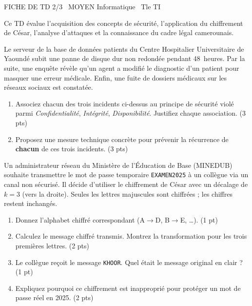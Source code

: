 \documentclass[11pt]{article}
\begin{document}
\begin{tcolorbox}[enhanced,colback=popink,colframe=popink,arc=10pt,boxrule=0pt,left=12pt,right=12pt,top=9pt,bottom=9pt]
{\color{white}\popxbold\small FICHE DE TD 2/3 \textbullet\ MOYEN \hfill Informatique \textbullet\ Tle TI\par}
\end{tcolorbox}
\vspace{4pt}
Ce TD évalue l'acquisition des concepts de sécurité, l'application du chiffrement de César, l'analyse d'attaques et la connaissance du cadre légal camerounais.

\begin{exercice}
Le serveur de la base de données patients du Centre Hospitalier Universitaire de Yaoundé subit une panne de disque dur non redondée pendant 48~heures. Par la suite, une enquête révèle qu'un agent a modifié le diagnostic d'un patient pour masquer une erreur médicale. Enfin, une fuite de dossiers médicaux sur les réseaux sociaux est constatée.
\begin{enumerate}
    \item Associez chacun des trois incidents ci-dessus au principe de sécurité violé parmi \textit{Confidentialité}, \textit{Intégrité}, \textit{Disponibilité}. Justifiez chaque association. \hfill (3 pts)
    \item Proposez une mesure technique concrète pour prévenir la récurrence de \textbf{chacun} de ces trois incidents. \hfill (3 pts)
\end{enumerate}
\end{exercice}

\begin{exercice}
Un administrateur réseau du Ministère de l'Éducation de Base (MINEDUB) souhaite transmettre le mot de passe temporaire \texttt{EXAMEN2025} à un collègue via un canal non sécurisé. Il décide d'utiliser le chiffrement de César avec un décalage de $k = 3$ (vers la droite). Seules les lettres majuscules sont chiffrées ; les chiffres restent inchangés.
\begin{enumerate}
    \item Donnez l'alphabet chiffré correspondant (A$\to$D, B$\to$E, \dots). \hfill (1 pt)
    \item Calculez le message chiffré transmis. Montrez la transformation pour les trois premières lettres. \hfill (2 pts)
    \item Le collègue reçoit le message \texttt{KHOOR}. Quel était le message original en clair ? \hfill (1 pt)
    \item Expliquez pourquoi ce chiffrement est inapproprié pour protéger un mot de passe réel en 2025. \hfill (2 pts)
\end{enumerate}
\end{exercice}
\end{document}

